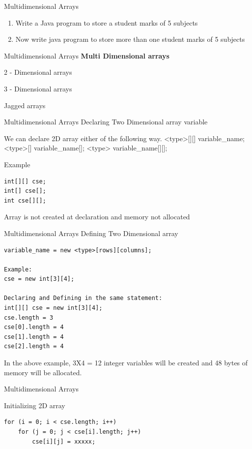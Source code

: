 \documentclass[14pt]{beamer}
\begin{document}
\begin{frame}{Multidimensional Arrays}
\begin{enumerate}
\item Write a Java program to store a student marks of 5 subjects
\item Now write java program to store more than one student marks of 5 subjects
\end{enumerate}
\end{frame}

\begin{frame}{Multidimensional Arrays}
\textbf{Multi Dimensional  arrays}

 2 - Dimensional arrays

 3 - Dimensional arrays

 Jagged arrays
\end{frame}

\begin{frame}[fragile]{Multidimensional Arrays}
Declaring Two Dimensional array variable

We can declare 2D array either of the following way.
<type>[][] variable\_name;
<type>[] variable\_name[];
<type> variable\_name[][];
\begin{block}{Example}
\begin{lstlisting}[numbers=none]
int[][] cse;
int[] cse[];
int cse[][];
\end{lstlisting}
\end{block}
Array is not created at declaration and memory not allocated
\end{frame}

\begin{frame}[fragile]{Multidimensional Arrays}
Defining  Two Dimensional array
\begin{lstlisting}[numbers=none]
variable_name = new <type>[rows][columns];

Example: 
cse = new int[3][4];

Declaring and Defining in the same statement:
int[][] cse = new int[3][4];		
cse.length = 3
cse[0].length = 4
cse[1].length = 4
cse[2].length = 4
\end{lstlisting}
In the above example, 3X4 = 12 integer variables will be created and 48 bytes of memory will be allocated.
\end{frame}

\begin{frame}[fragile]{Multidimensional Arrays}
\begin{block}{Initializing 2D array}
\begin{lstlisting}[numbers=none]
for (i = 0; i < cse.length; i++)
    for (j = 0; j < cse[i].length; j++)
        cse[i][j] = xxxxx;
\end{lstlisting}
\end{block}
\end{frame}
\end{document}
